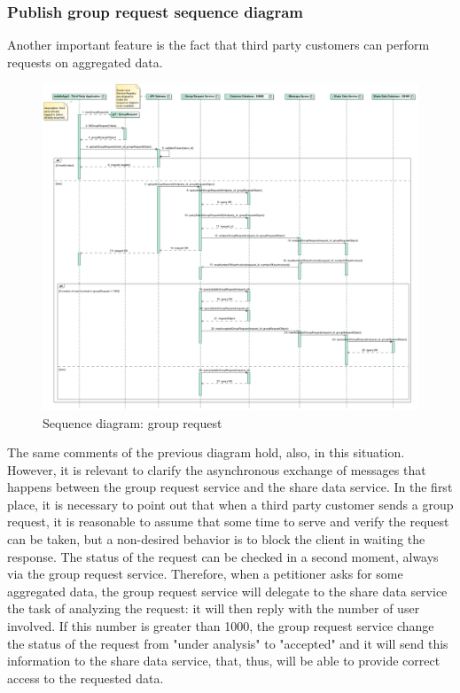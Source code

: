 \subsubsection{Publish group request sequence diagram}
Another important feature is the fact that third party customers can perform requests on aggregated data. \\


\begin{figure}[H]
\includegraphics[width=\linewidth]{Images/grouprequest.pdf}
\caption{ Sequence diagram: group request }
\label{fig:grouprequest}
\end{figure}

The same comments of the previous diagram hold, also, in this situation. 
However, it is relevant to clarify the asynchronous exchange of messages that happens between the group request service and the share data
service. 
In the first place, it is necessary to point out that when a third party customer sends a group request, it is reasonable to assume that 
some time to serve and verify the request can be taken, but a non-desired behavior is to block the client in waiting the response. The status
of the request can be checked in a second moment, always via the group request service. 
Therefore, when a petitioner asks for some aggregated data, the group request service will delegate to the share data service the task of 
analyzing the request: it will then reply with the number of user involved. If this number is greater than 1000, the group request service
change the status of the request from "under analysis" to "accepted" and it will send this information to the share data service, that, thus,
will be able to provide correct access to the requested data. \\

